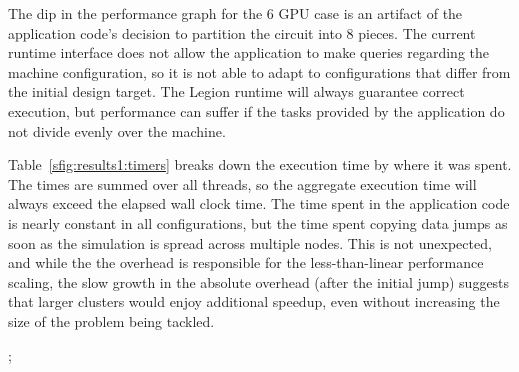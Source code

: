 The dip in the performance graph for the 6 GPU case is an artifact of the
application code's decision to partition the circuit into 8 pieces.  The
current runtime interface does not allow the application to make queries
regarding the machine configuration, so it is not able to adapt to
configurations that differ from the initial design target.  The Legion runtime
will always guarantee correct execution, but performance can suffer if the
tasks provided by the application do not divide evenly over the machine.

Table~\ref{sfig:results1:timers} breaks down the execution time by where it was
spent.  The times are summed over all threads, so the aggregate execution time
will always exceed the elapsed wall clock time.  The time spent in the 
application code is nearly constant in all configurations, but the time spent
copying data jumps as soon as the simulation is spread across multiple nodes.
This is not unexpected, and while the the overhead is responsible for the
less-than-linear performance scaling, the slow growth in the absolute overhead
(after the initial jump) suggests that larger clusters would enjoy additional
speedup, even without increasing the size of the problem being tackled.

;


